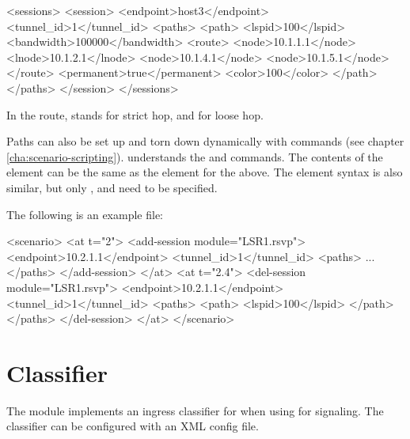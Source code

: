 \begin{XML}
<sessions>
    <session>
        <endpoint>host3</endpoint>
        <tunnel_id>1</tunnel_id>
        <paths>
            <path>
                <lspid>100</lspid>
                <bandwidth>100000</bandwidth>
                <route>
                    <node>10.1.1.1</node>
                    <lnode>10.1.2.1</lnode>
                    <node>10.1.4.1</node>
                    <node>10.1.5.1</node>
                </route>
                <permanent>true</permanent>
                <color>100</color>
            </path>
        </paths>
    </session>
</sessions>
\end{XML}

In the route,  stands for strict hop, and  for loose hop.

Paths can also be set up and torn down dynamically with  
commands (see chapter \ref{cha:scenario-scripting}). 
 understands the  and 
 commands. The contents of the 
element can be the same as the  element for the 
above. The  element syntax is also similar, but only
,  and  need to be specified.

The following is an example  file:

\begin{XML}
<scenario>
    <at t="2">
        <add-session module="LSR1.rsvp">
            <endpoint>10.2.1.1</endpoint>
            <tunnel_id>1</tunnel_id>
            <paths>
                ...
            </paths>
        </add-session>
    </at>
    <at t="2.4">
        <del-session module="LSR1.rsvp">
            <endpoint>10.2.1.1</endpoint>
            <tunnel_id>1</tunnel_id>
            <paths>
                <path>
                    <lspid>100</lspid>
                </path>
            </paths>
        </del-session>
    </at>
</scenario>
\end{XML}

\section{Classifier}

The  module implements an ingress classifier for
 when using  for signaling. The classifier can be
configured with an XML config file.

